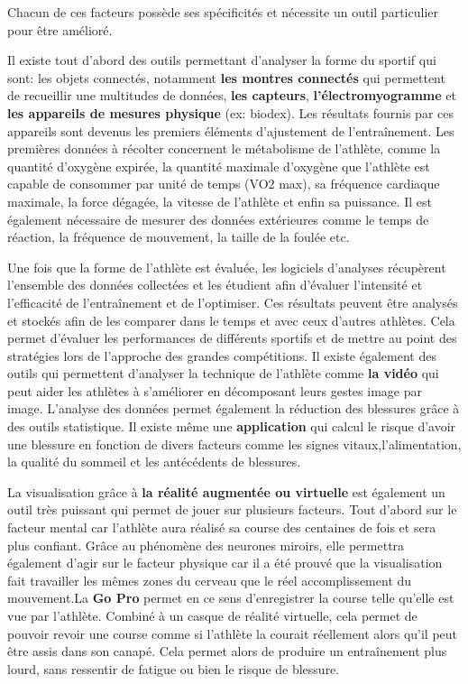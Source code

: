 Chacun de ces facteurs possède ses spécificités et nécessite un outil particulier pour être amélioré.

Il existe tout d'abord des outils permettant d'analyser la forme du sportif qui sont: les objets connectés, notamment \textbf{les montres connectés} qui permettent de recueillir une multitudes de données, \textbf{les capteurs},  \textbf{l'électromyogramme} et \textbf{les appareils de mesures physique} (ex: biodex). Les résultats fournis par ces appareils sont devenus les premiers éléments d'ajustement de l'entraînement. Les premières données à récolter concernent le métabolisme de l'athlète, comme la quantité d'oxygène expirée, la quantité maximale d’oxygène que l’athlète est capable de consommer par unité de temps (VO2 max), sa fréquence cardiaque maximale, la force dégagée, la vitesse de l'athlète et enfin sa puissance. Il est également nécessaire de mesurer des données extérieures comme le temps de réaction, la fréquence de mouvement, la taille de la foulée etc.

Une fois que la forme de l'athlète est évaluée, les logiciels d'analyses récupèrent l’ensemble des données collectées et les étudient afin d’évaluer l’intensité et l’efficacité de l’entraînement et de l'optimiser. Ces résultats peuvent être analysés et stockés afin de les comparer dans le temps et avec ceux d’autres athlètes. Cela permet d’évaluer les performances de différents sportifs et de mettre au point des stratégies lors de l’approche des grandes compétitions. Il existe également des outils qui permettent d'analyser la technique de l'athlète comme \textbf{la vidéo} qui peut aider les athlètes à s’améliorer en décomposant leurs gestes image par image. L'analyse des données permet également la réduction des blessures grâce à des outils statistique. Il existe même une \textbf{application} qui calcul le risque d'avoir une blessure en fonction de divers facteurs comme les signes vitaux,l'alimentation, la qualité du sommeil et les antécédents de blessures.

La visualisation grâce à \textbf{la réalité augmentée ou virtuelle} est également un outil très puissant qui permet de jouer sur plusieurs facteurs. Tout d'abord sur le facteur mental car l'athlète aura réalisé sa course des centaines de fois et sera plus confiant. Grâce au phénomène des neurones miroirs, elle permettra également d'agir sur le facteur physique car il a été prouvé que la visualisation fait travailler les mêmes zones du cerveau que le réel accomplissement du mouvement.La \textbf{Go Pro} permet en ce sens d'enregistrer la course telle qu'elle est vue par l'athlète. Combiné à un casque de réalité virtuelle, cela permet de pouvoir revoir une course comme si l'athlète la courait réellement alors qu'il peut être assis dans son canapé. Cela permet alors de produire un entraînement plus lourd, sans ressentir de fatigue ou bien le risque de blessure.



